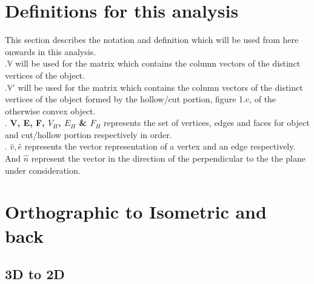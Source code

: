 \section{Definitions for this analysis}
This section describes the notation and definition which will be used from here onwards in this analysis.
\\
.$\mathbb{V}$ will be used for the matrix which contains the column vectors of the distinct vertices of the object.\\
.$\mathbb{V}'$ will be used for the matrix which contains the column vectors of the distinct vertices of the object formed by the hollow/cut portion, figure 1.c, of the otherwise convex object.
\\
. \textbf{V, E, F, $V_H$, $E_H$ \& $F_H$} represents the set of vertices, edges and faces for object and cut/hollow portion respectively in order.
\\
. $\hat{v}, \hat{e}$ represents the vector representation of a vertex and an edge respectively. And $\hat{n}$ represent the vector in the direction of the perpendicular to the the plane under consideration.

\section{Orthographic to Isometric and back}
\subsection{3D to 2D}
